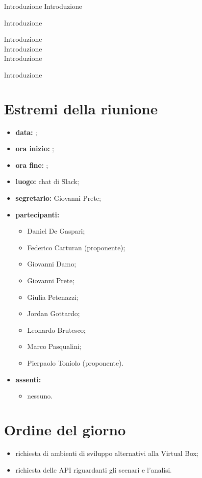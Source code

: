 \documentclass[a4paper,11pt]{article}
\begin{document}
	Introduzione
	Introduzione
	
	Introduzione
	
	
	Introduzione\\
	
	Introduzione\\
	
	Introduzione
	
	
	Introduzione

	\section{Estremi della riunione}
	\begin{itemize}
		\item \textbf{data:} ;
		\item \textbf{ora inizio:} ;
		\item \textbf{ora fine:} ;
		\item \textbf{luogo:} chat di Slack;
		\item \textbf{segretario:} Giovanni Prete;
		\item \textbf{partecipanti:}
		\begin{itemize}
			 \item Daniel De Gaspari;
			 \item Federico Carturan (proponente);
			 \item Giovanni Damo;
			 \item Giovanni Prete;
			 \item Giulia Petenazzi;
			 \item Jordan Gottardo;
			 \item Leonardo Brutesco;
			 \item Marco Pasqualini;
			 \item Pierpaolo Toniolo (proponente).
		\end{itemize}
		\item \textbf{assenti:}
			\begin{itemize}
					 \item nessuno.
			\end{itemize}
	\end{itemize}
	\section{Ordine del giorno}
		\begin{itemize}
			\item richiesta di ambienti di sviluppo alternativi alla Virtual Box;
			\item richiesta delle API riguardanti gli scenari e l'analisi.
		\end{itemize}
\end{document}
